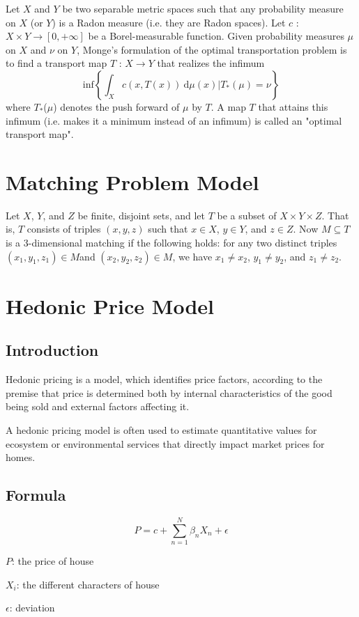 \documentclass[12pt]{article}
\begin{document}
Let $X$ and $Y$ be two separable metric spaces such that any probability measure on $X$ (or $Y$) is a Radon measure (i.e. they are Radon spaces). Let $c$ : $X \times Y \rightarrow [0, +\infty]$ be a Borel-measurable function. Given probability measures $\mu$ on $X$ and $\nu$ on $Y$, Monge's formulation of the optimal transportation problem is to find a transport map $T$ : $X \rightarrow Y$ that realizes the infimum
$$\mathrm{inf}\left\{ \int_{X}c(x,T(x))\ \mathrm{d}\mu(x)\Bigg| T_*(\mu)=\nu\right\} $$
where $T_*$($\mu$) denotes the push forward of $\mu$ by $T$. A map $T$ that attains this infimum (i.e. makes it a minimum instead of an infimum) is called an "optimal transport map".
\section{Matching Problem Model}
Let $X$, $Y$, and $Z$ be finite, disjoint sets, and let $T$ be a subset of $X \times Y \times Z$. That is, $T$ consists of triples $(x, y, z)$ such that $x \in X$, $y \in Y$, and $z \in Z$. Now $M \subseteq T$ is a 3-dimensional matching if the following holds: for any two distinct triples $(x_{1}, y_{1}, z_{1}) \in M $and $(x_{2}, y_{2}, z_{2}) \in M$, we have $x_{1} \neq x_{2}$, $y_{1} \neq y_{2}$, and $z_{1} \neq z_{2}$.

\section{Hedonic Price Model}
\subsection{Introduction}
Hedonic pricing is a model, which identifies price factors, according to the premise that price is determined both by internal characteristics of the good being sold and external factors affecting it.

A hedonic pricing model is often used to estimate quantitative values for ecosystem or environmental services that directly impact market prices for homes.
\subsection{Formula}
$$P=c+\sum_{n=1}^{N}\beta_{n}X_{n}+\epsilon$$

$P$: the price of house

$X_{i}$: the different characters of house

$\epsilon$: deviation
\end{document}

